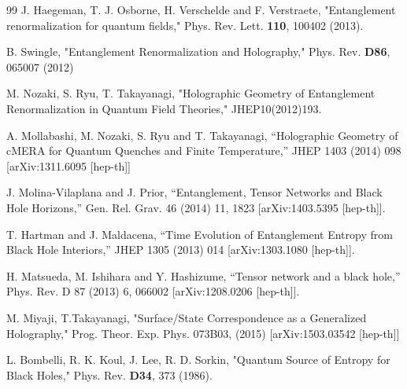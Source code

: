 \documentclass[preprint,aps]{revtex4}
\begin{document}
\begin{thebibliography}{99}
 J. Haegeman, T. J. Osborne, H. Verschelde and F. Verstraete, "Entanglement renormalization for quantum fields," 	Phys. Rev. Lett. {\bf 110}, 100402 (2013). 

 B. Swingle, "Entanglement Renormalization and Holography," Phys. Rev. {\bf D86}, 065007 (2012)

 M. Nozaki, S. Ryu, T. Takayanagi, "Holographic Geometry of Entanglement Renormalization in Quantum Field Theories," JHEP10(2012)193.

 A. Mollabashi, M. Nozaki, S. Ryu and T. Takayanagi, “Holographic Geometry of cMERA for Quantum Quenches and Finite Temperature,” JHEP 1403 (2014) 098 [arXiv:1311.6095 [hep-th]]

 J. Molina-Vilaplana and J. Prior, “Entanglement, Tensor Networks and Black Hole Horizons,” Gen. Rel. Grav. 46 (2014) 11, 1823 [arXiv:1403.5395 [hep-th]].

 T. Hartman and J. Maldacena, “Time Evolution of Entanglement Entropy from Black Hole Interiors,” JHEP 1305 (2013) 014 [arXiv:1303.1080 [hep-th]].

 H. Matsueda, M. Ishihara and Y. Hashizume, “Tensor network and a black hole,” Phys. Rev. D 87 (2013) 6, 066002 [arXiv:1208.0206 [hep-th]].


 M. Miyaji, T.Takayanagi, "Surface/State Correspondence as a Generalized Holography," Prog. Theor. Exp. Phys. 073B03, (2015) [arXiv:1503.03542 [hep-th]]

 L. Bombelli, R. K. Koul, J. Lee, R. D. Sorkin, "Quantum Source of Entropy for Black Holes," Phys. Rev. 
{\bf D34}, 373 (1986).


\end{thebibliography}
\end{document}
